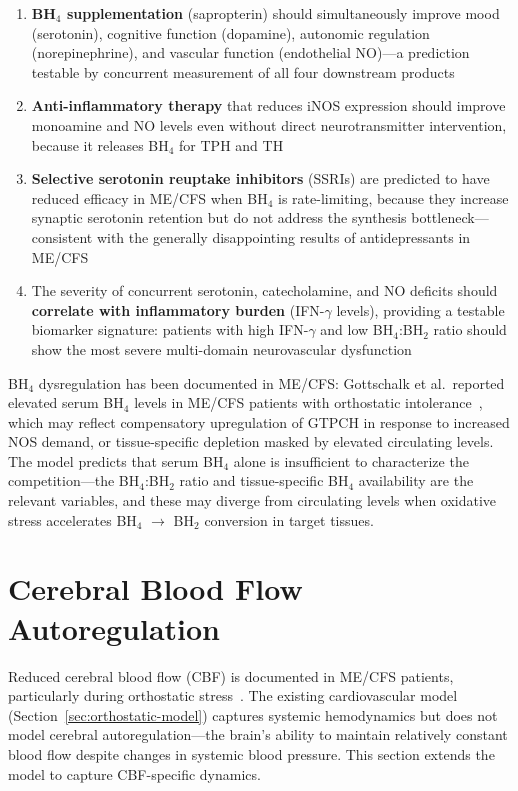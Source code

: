 \begin{enumerate}
    \item \textbf{BH$_4$ supplementation} (sapropterin) should simultaneously improve mood (serotonin), cognitive function (dopamine), autonomic regulation (norepinephrine), and vascular function (endothelial NO)---a prediction testable by concurrent measurement of all four downstream products
    \item \textbf{Anti-inflammatory therapy} that reduces iNOS expression should improve monoamine and NO levels even without direct neurotransmitter intervention, because it releases BH$_4$ for TPH and TH
    \item \textbf{Selective serotonin reuptake inhibitors} (SSRIs) are predicted to have reduced efficacy in ME/CFS when BH$_4$ is rate-limiting, because they increase synaptic serotonin retention but do not address the synthesis bottleneck---consistent with the generally disappointing results of antidepressants in ME/CFS
    \item The severity of concurrent serotonin, catecholamine, and NO deficits should \textbf{correlate with inflammatory burden} (IFN-$\gamma$ levels), providing a testable biomarker signature: patients with high IFN-$\gamma$ and low BH$_4$:BH$_2$ ratio should show the most severe multi-domain neurovascular dysfunction
\end{enumerate}

BH$_4$ dysregulation has been documented in ME/CFS: Gottschalk et al.\ reported elevated serum BH$_4$ levels in ME/CFS patients with orthostatic intolerance~\cite{Gottschalk2023}, which may reflect compensatory upregulation of GTPCH in response to increased NOS demand, or tissue-specific depletion masked by elevated circulating levels. The model predicts that serum BH$_4$ alone is insufficient to characterize the competition---the BH$_4$:BH$_2$ ratio and tissue-specific BH$_4$ availability are the relevant variables, and these may diverge from circulating levels when oxidative stress accelerates BH$_4$ $\to$ BH$_2$ conversion in target tissues.

\section{Cerebral Blood Flow Autoregulation}
\label{sec:cbf-autoregulation}

Reduced cerebral blood flow (CBF) is documented in ME/CFS patients, particularly during orthostatic stress~\cite{Novak2022CBFReview}. The existing cardiovascular model (Section~\ref{sec:orthostatic-model}) captures systemic hemodynamics but does not model cerebral autoregulation---the brain's ability to maintain relatively constant blood flow despite changes in systemic blood pressure. This section extends the model to capture CBF-specific dynamics.

